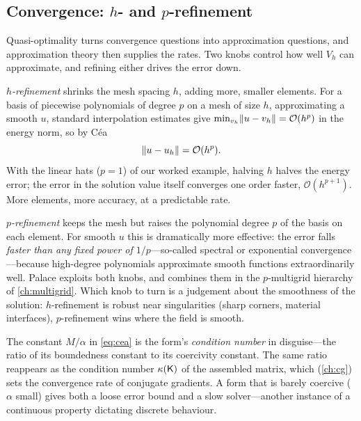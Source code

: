 \subsection{Convergence: \texorpdfstring{$h$}{h}- and \texorpdfstring{$p$}{p}-refinement}

Quasi-optimality turns convergence questions into approximation questions, and
approximation theory then supplies the rates. Two knobs control how well $V_h$
can approximate, and refining either drives the error down.

\emph{$h$-refinement} shrinks the mesh spacing $h$, adding more, smaller elements.
For a basis of piecewise polynomials of degree $p$ on a mesh of size $h$,
approximating a smooth $u$, standard interpolation estimates give
$\min_{v_h}\lVert u-v_h\rVert=\mathcal{O}(h^{p})$ in the energy norm, so by Céa
\begin{equation}
\lVert u-u_h\rVert=\mathcal{O}(h^{p}).
\label{eq:hrate}
\end{equation}
With the linear hats ($p=1$) of our worked example, halving $h$ halves the energy
error; the error in the solution value itself converges one order faster,
$\mathcal{O}(h^{p+1})$. More elements, more accuracy, at a predictable rate.

\emph{$p$-refinement} keeps the mesh but raises the polynomial degree $p$ of the
basis on each element. For smooth $u$ this is dramatically more effective: the
error falls \emph{faster than any fixed power of $1/p$}---so-called spectral or
exponential convergence---because high-degree polynomials approximate smooth
functions extraordinarily well. Palace exploits both knobs, and combines them in
the $p$-multigrid hierarchy of \cref{ch:multigrid}. Which knob to turn is a
judgement about the smoothness of the solution: $h$-refinement is robust near
singularities (sharp corners, material interfaces), $p$-refinement wins where the
field is smooth.

\begin{remark}
The constant $M/\alpha$ in \cref{eq:cea} is the form's \emph{condition number} in
disguise---the ratio of its boundedness constant to its coercivity constant. The
same ratio reappears as the condition number $\kappa(\mathsf{K})$ of the assembled
matrix, which (\cref{ch:cg}) sets the convergence rate of conjugate gradients.
A form that is barely coercive ($\alpha$ small) gives both a loose error bound and
a slow solver---another instance of a continuous property dictating discrete
behaviour.
\end{remark}

